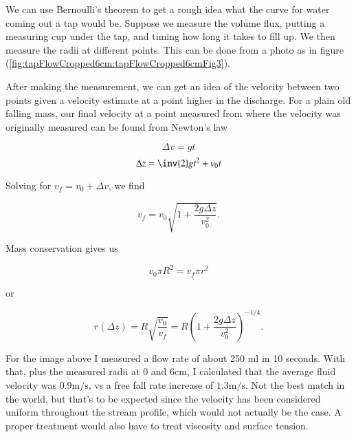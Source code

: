 \begin{Exercise}[
title={Curve for tap discharge.},
label={problem:fluids:review:q2}
]
\end{Exercise}

\begin{Answer}[ref={problem:fluids:review:q2}]
We can use Bernoulli's theorem to get a rough idea what the curve for water coming out a tap would be.  Suppose we measure the volume flux, putting a measuring cup under the tap, and timing how long it takes to fill up.  We then measure the radii at different points.  This can be done from a photo as in figure (\ref{fig:tapFlowCropped6cm:tapFlowCropped6cmFig3}).


After making the measurement, we can get an idea of the velocity between two points given a velocity estimate at a point higher in the discharge.  For a plain old falling mass, our final velocity at a point measured from where the velocity was originally measured can be found from Newton's law

\begin{equation}\label{eqn:continuumFluidsReview:1910}
\Delta v = g t
\end{equation}
\begin{equation}\label{eqn:continuumFluidsReview:1930}
\Delta z = \inv{2} g t^2 + v_0 t
\end{equation}

Solving for $v_f = v_0 + \Delta v$, we find

\begin{equation}\label{eqn:continuumFluidsReview:1950}
v_f = v_0 \sqrt{ 1 + \frac{2 g \Delta z}{v_0^2} }.
\end{equation}

Mass conservation gives us

\begin{equation}\label{eqn:continuumFluidsReview:1970}
v_0 \pi R^2 = v_f \pi r^2
\end{equation}

or

\begin{equation}\label{eqn:continuumFluidsReview:1990}
r(\Delta z) = R \sqrt{ \frac{v_0}{v_f} } = R \left( 1 + \frac{2 g \Delta z}{v_0^2} \right)^{-1/4}.
\end{equation}

For the image above I measured a flow rate of about 250 ml in 10 seconds.  With that, plus the measured radii at 0 and $6 \text{cm}$, I calculated that the average fluid velocity was $0.9 \text{m}/\text{s}$, vs a free fall rate increase of $1.3 \text{m}/\text{s}$.  Not the best match in the world, but that's to be expected since the velocity has been considered uniform throughout the stream profile, which would not actually be the case.  A proper treatment would also have to treat viscosity and surface tension.


\end{Answer}
